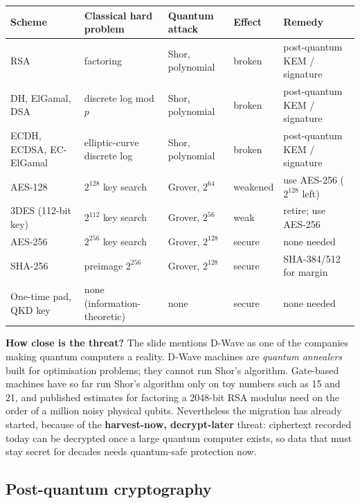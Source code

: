 \begin{center}\small
\begin{tabularx}{\textwidth}{@{}l l l l X@{}}
\toprule
Scheme & Classical hard problem & Quantum attack & Effect & Remedy\\
\midrule
RSA & factoring & Shor, polynomial & broken & post-quantum KEM / signature\\
DH, ElGamal, DSA & discrete log mod $p$ & Shor, polynomial & broken & post-quantum KEM / signature\\
ECDH, ECDSA, EC-ElGamal & elliptic-curve discrete log & Shor, polynomial & broken & post-quantum KEM / signature\\
AES-128 & $2^{128}$ key search & Grover, $2^{64}$ & weakened & use AES-256 ($2^{128}$ left)\\
3DES (112-bit key) & $2^{112}$ key search & Grover, $2^{56}$ & weak & retire; use AES-256\\
AES-256 & $2^{256}$ key search & Grover, $2^{128}$ & secure & none needed\\
SHA-256 & preimage $2^{256}$ & Grover, $2^{128}$ & secure & SHA-384/512 for margin\\
One-time pad, QKD key & none (information-theoretic) & none & secure & none needed\\
\bottomrule
\end{tabularx}
\end{center}

\textbf{How close is the threat?} The slide mentions D-Wave as one of the companies making quantum computers a reality. D-Wave machines are \emph{quantum annealers} built for optimisation problems; they cannot run Shor's algorithm. Gate-based machines have so far run Shor's algorithm only on toy numbers such as 15 and 21, and published estimates for factoring a 2048-bit RSA modulus need on the order of a million noisy physical qubits. Nevertheless the migration has already started, because of the \textbf{harvest-now, decrypt-later} threat: ciphertext recorded today can be decrypted once a large quantum computer exists, so data that must stay secret for decades needs quantum-safe protection now.

\subsection{Post-quantum cryptography \new}

